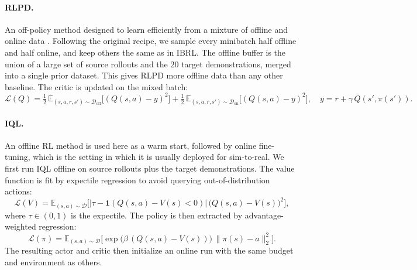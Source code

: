 \documentclass{article} %
\begin{document}
\paragraph{RLPD.}
An off-policy method designed to learn efficiently from a mixture of offline and online data \citep{ball2023efficient}. Following the original recipe, we sample every minibatch half offline and half online, and keep others the same as in IBRL. The offline buffer is the union of a large set of source rollouts and the $20$ target demonstrations, merged into a single prior dataset. This gives RLPD more offline data than any other baseline. The critic is updated on
the mixed batch:
\begin{equation}
\mathcal{L}(Q) = \tfrac{1}{2}\,
\mathbb{E}_{(s,a,r,s')\sim\mathcal{D}_{\text{off}}}\!\big[(Q(s,a) - y)^2\big]
+ \tfrac{1}{2}\,
\mathbb{E}_{(s,a,r,s')\sim\mathcal{D}_{\text{on}}}\!\big[(Q(s,a) - y)^2\big],
\quad y = r + \gamma\,\bar{Q}(s',\pi(s')).
\label{eq:rlpd}
\end{equation}

\paragraph{IQL.}
An offline RL method \citep{kostrikov2021offline} is used here as a warm start, followed by online fine-tuning, which is the setting in which it is usually deployed for sim-to-real. We first run IQL offline on source rollouts plus the target demonstrations. The value function is fit by expectile regression to avoid querying out-of-distribution actions:
\begin{equation}
\mathcal{L}(V) = \mathbb{E}_{(s,a)\sim\mathcal{D}}\!\Big[
\lvert\tau - \mathbf{1}(Q(s,a) - V(s) < 0)\rvert\,
\big(Q(s,a) - V(s)\big)^2\Big],
\label{eq:iql-value}
\end{equation}
where $\tau \in (0,1)$ is the expectile. The policy is then extracted by advantage-weighted regression:
\begin{equation}
\mathcal{L}(\pi) = \mathbb{E}_{(s,a)\sim\mathcal{D}}\!\Big[
\exp\!\big(\beta\,(Q(s,a) - V(s))\big)\,
\lVert\pi(s) - a\rVert_2^2\Big].
\label{eq:iql-policy}
\end{equation}
The resulting actor and critic then initialize an online run with the same budget and environment as others.
\end{document}
